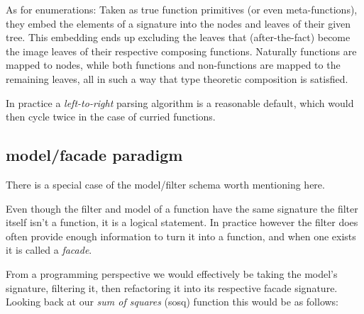 \documentclass[twoside]{article}
\begin{document}
As for enumerations: Taken as true function primitives (or even meta-functions), they embed the elements
of a signature into the nodes and leaves of their given tree. This embedding ends up excluding the leaves
that (after-the-fact) become the image leaves of their respective composing functions. Naturally functions
are mapped to nodes, while both functions and non-functions are mapped to the remaining leaves,
all in such a way that type theoretic composition is satisfied.

In practice a \emph{left-to-right} parsing algorithm is a reasonable default,
which would then cycle twice in the case of curried functions.

\subsection*{model/facade paradigm}

There is a special case of the model/filter schema worth mentioning here.

Even though the filter and model of a function have the same signature the filter itself isn't a function,
it is a logical statement. In practice however the filter does often provide enough information to turn it
into a function, and when one exists it is called a \emph{facade}.

From a programming perspective we would effectively be taking the model's signature, filtering it,
then refactoring it into its respective facade signature. Looking back at our \emph{sum of squares}
(sosq) function this would be as follows:
\end{document}
